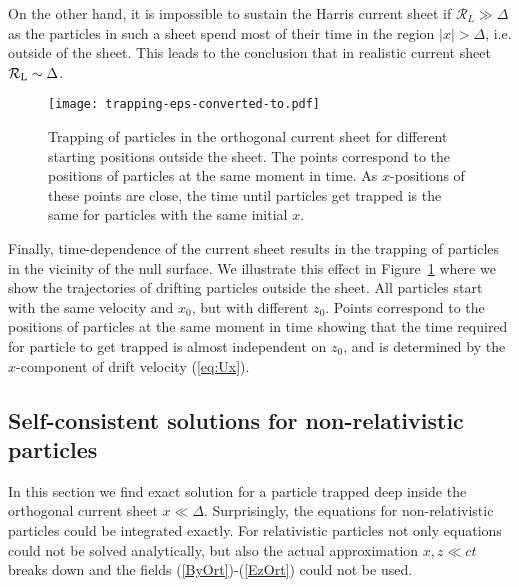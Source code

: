 \documentclass[useAMS,usenatbib]{mn2e}
\begin{document}
On the other hand, it is impossible to sustain the Harris current sheet if 
$\mathcal{R}_L \gg \Delta$ as the particles in such a sheet spend most of 
their time in the region $|x| > \Delta$, i.e. outside of the sheet. This 
leads to the conclusion that in realistic current sheet
$\mathcal{R}_{\rm L} \sim \Delta$.

\begin{figure}
\centering
\texttt{[image: trapping-eps-converted-to.pdf]}
\caption{Trapping of particles in the orthogonal current sheet for different starting 
positions outside the sheet. The points correspond to the positions of particles at 
the same moment in time. As $x$-positions of these points are close, the time until
particles get trapped is the same for particles with the same initial $x$.}
\label{fig:trap}
\end{figure}

{ Finally, time-dependence of the current sheet results in the trapping
of particles in the vicinity of the null surface. We illustrate this effect in
Figure~\ref{fig:trap} where we show} the trajectories of drifting particles outside the 
sheet. All particles start with the same velocity and $x_0$, but with different $z_0$. 
Points correspond to the positions of particles at the same moment in time showing that 
the time required for particle to get trapped is almost independent on $z_0$, and is 
determined by the $x$-component of drift velocity (\ref{eq:Ux}).

\subsection{Self-consistent solutions for non-relativistic particles}
\label{sect:solAn}

In this section we find exact solution for a particle trapped deep inside the orthogonal
current sheet $x \ll \Delta$. Surprisingly, the equations for non-relativistic particles 
could be integrated exactly. For relativistic particles not only equations could not be 
solved analytically, but also the actual approximation $x,z \ll ct$ breaks down and the 
fields (\ref{ByOrt})-(\ref{EzOrt}) could not be used.
\end{document}

